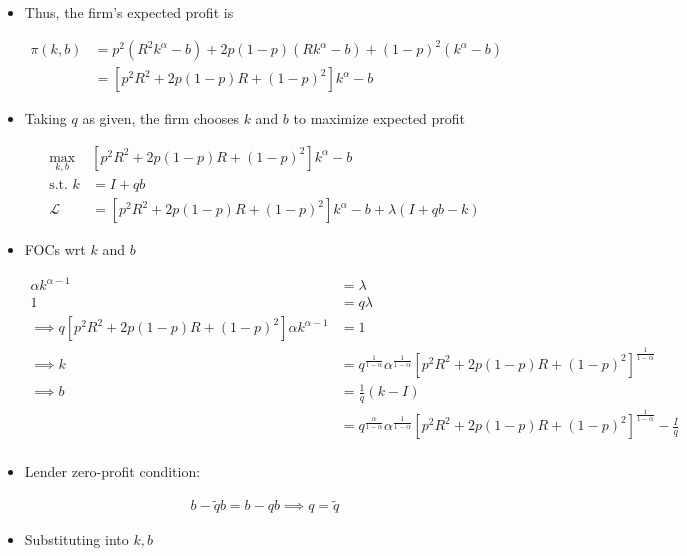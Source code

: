 \documentclass{article}
\newcommand{\Lfn}{\mathcal{L}}
\begin{document}
\begin{itemize}
\item Thus, the firm's expected profit is

\begin{align*}
\pi(k,b) 
&= p^2 (R^2 k^\alpha - b) + 2p(1-p) (R k^\alpha - b) + (1-p)^2 (k^\alpha - b)\\
&= [p^2 R^2 + 2p(1-p) R  + (1-p)^2] k^\alpha - b
\end{align*}

\item Taking $q$ as given, the firm chooses $k$ and $b$ to maximize expected profit

\begin{align*}
\max_{k,b} & [p^2 R^2 + 2p(1-p) R  + (1-p)^2] k^\alpha - b\\
\text{s.t. } k &= I + qb\\
\Lfn &= [p^2 R^2 + 2p(1-p) R  + (1-p)^2] k^\alpha - b + \lambda(I + qb - k)
\end{align*}

\item FOCs wrt $k$ and $b$

\begin{align*}
[p^2 R^2 + 2p(1-p) R  + (1-p)^2] \alpha k^{\alpha-1}  &= \lambda\\
1  &= q \lambda\\
\implies
q[p^2 R^2 + 2p(1-p) R  + (1-p)^2] \alpha k^{\alpha-1} &= 1 \\
\implies
k 
&= q^{\frac{1}{1-\alpha}} \alpha^{\frac{1}{1-\alpha}}[p^2 R^2 + 2p(1-p) R  + (1-p)^2]^{\frac{1}{1-\alpha}}\\
\implies
b 
&= \frac{1}{q}(k - I)\\
&= q^{\frac{\alpha}{1-\alpha}} \alpha^{\frac{1}{1-\alpha}}[p^2 R^2 + 2p(1-p) R  + (1-p)^2]^{\frac{1}{1-\alpha}} - \frac{I}{q}\\
\end{align*}

\item Lender zero-profit condition:

\begin{align*}
b - \tilde q b = b - q b \implies q = \tilde q
\end{align*}

\item Substituting into $k,b$


\end{itemize}
\end{document}
